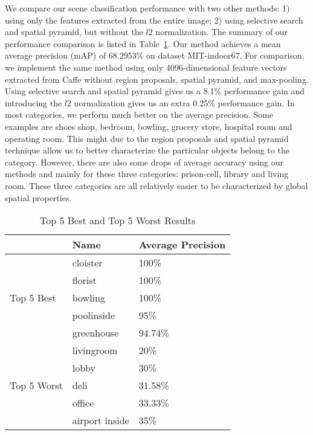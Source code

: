 We compare our scene classification performance with two other methods: 1) using only the
features extracted from the entire image; 2) using selective search and spatial pyramid, but without the
$l2$ normalization. The summary of our performance comparison is listed in Table~\ref{tab:overall}.
Our method achieves a mean average precision (mAP) of 68.2953\% on dataset
MIT-indoor67. For comparison, we implement the same method using only 4096-dimensional
feature vectors extracted from Caffe without region proposals, spatial pyramid, and max-pooling.
Using selective search and spatial pyramid gives us a 8.1\% performance gain and introducing
the $l2$ normalization gives us an extra 0.25\% performance gain. In most categories, we perform much
better on the average precision. Some examples are shoes shop, bedroom, bowling, grocery store, hospital room and operating
room. This might due to the region proposals and spatial pyramid technique
allow us to better characterize the particular objects belong to the category.
However, there are also some drops of average accuracy using our methods and
mainly for these three categories: prison-cell, library and living room. These
three categories are all relatively easier to be characterized by global
spatial properties.

\begin{table}[ht]
        \caption{Top 5 Best and Top 5 Worst Results}
        \centering
        \begin{tabular}{l l l}
        \hline \hline
        & Name           & Average Precision \\ \hline
        \multirow{5}{*}{Top 5 Best}
        & cloister       & 100\% \\
        & florist        & 100\% \\
        & bowling        & 100\% \\
        & poolinside     & 95\% \\
        & greenhouse     & 94.74\% \\
        \hline
        \multirow{5}{*}{Top 5 Worst}
        & livingroom     & 20\% \\
        & lobby          & 30\% \\
        & deli           & 31.58\% \\
        & office         & 33.33\% \\
        & airport inside & 35\% \\
        \hline
        \end{tabular}
        \label{tab:overall}
\end{table}


